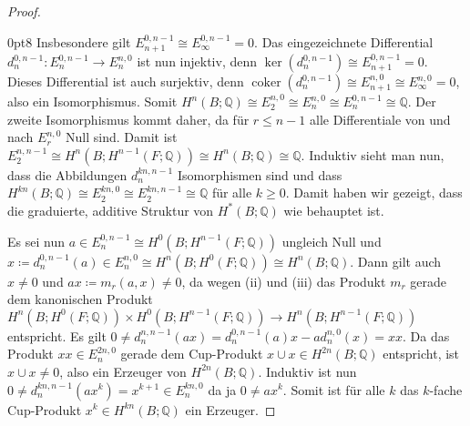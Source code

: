 \documentclass[11pt, a4paper, german]{article}
\theoremstyle{definition}
\theoremstyle{remark}
\newcommand{\Q}{\mathbb{Q}} %
\DeclareMathOperator{\coker}{coker} %
\begin{document}
\begin{proof}
\begin{cutout}{0}{\dimexpr\linewidth-8cm\relax}{0pt}{8}
    Insbesondere gilt $E_{n+1}^{0,n-1} \cong E_\infty^{0,n-1} = 0$.
    Das eingezeichnete Differential $d_n^{0,n-1} : E_n^{0,n-1} \to E_n^{n,0}$ ist nun injektiv, denn $\ker(d_n^{0,n-1}) \cong E_{n+1}^{0,n-1} = 0$.
    Dieses Differential ist auch surjektiv, denn $\coker(d_n^{0,n-1}) \cong E_{n+1}^{n,0} \cong E_\infty^{n,0} = 0$, also ein Isomorphismus.
    Somit $H^n(B; \Q) \cong E_2^{n,0} \cong E_n^{n,0} \cong E_n^{0,n-1} \cong \Q$.
    Der zweite Isomorphismus kommt daher, da für $r \leq n-1$ alle Differentiale von und nach $E_r^{n,0}$ Null sind. %
    Damit ist $E_2^{n,n-1} \cong H^{n}(B; H^{n-1}(F; \Q)) \cong H^{n}(B; \Q) \cong \Q$.
    Induktiv sieht man nun, dass die Abbildungen $d_n^{kn,n-1}$ Isomorphismen sind und dass $H^{kn}(B; \Q) \cong E_2^{kn,0} \cong  E_2^{kn,n-1} \cong \Q$ für alle $k \geq 0$.
    Damit haben wir gezeigt, dass die graduierte, additive Struktur von $H^*(B; \Q)$ wie behauptet ist.
  \end{cutout}
  Es sei nun $a \in E_n^{0,n-1} \cong H^0(B; H^{n-1}(F; \Q))$ ungleich Null und $x \coloneqq d_n^{0,n-1}(a) \in E_n^{n,0} \cong H^n(B; H^0(F; \Q)) \cong H^n(B; \Q)$.
  Dann gilt auch $x \neq 0$ und $ax \coloneqq m_r(a, x) \neq 0$, da wegen (ii) und (iii) das Produkt $m_r$ gerade dem kanonischen Produkt $H^n(B; H^0(F; \Q)) \times H^0(B; H^{n-1}(F; \Q)) \to H^n(B; H^{n-1}(F; \Q))$ entspricht. %
  Es gilt
  $0 \neq d_n^{n,n-1}(ax) = d_n^{0,n-1}(a)x - a d_n^{n,0}(x) = xx$.
  Da das Produkt $xx \in E_n^{2n,0}$ gerade dem Cup-Produkt $x \cup x \in H^{2n}(B; \Q)$ entspricht, ist $x \cup x \neq 0$, also ein Erzeuger von $H^{2n}(B; \Q)$.
  Induktiv ist nun $0 \neq d_n^{kn,n-1}(a x^k) = x^{k+1} \in E_n^{kn,0}$ da ja $0 \neq a x^k$.
  Somit ist für alle $k$ das $k$-fache Cup-Produkt $x^k \in H^{kn}(B; \Q)$ ein Erzeuger.

  \vspace{1.5cm}


\end{proof}
\end{document}
